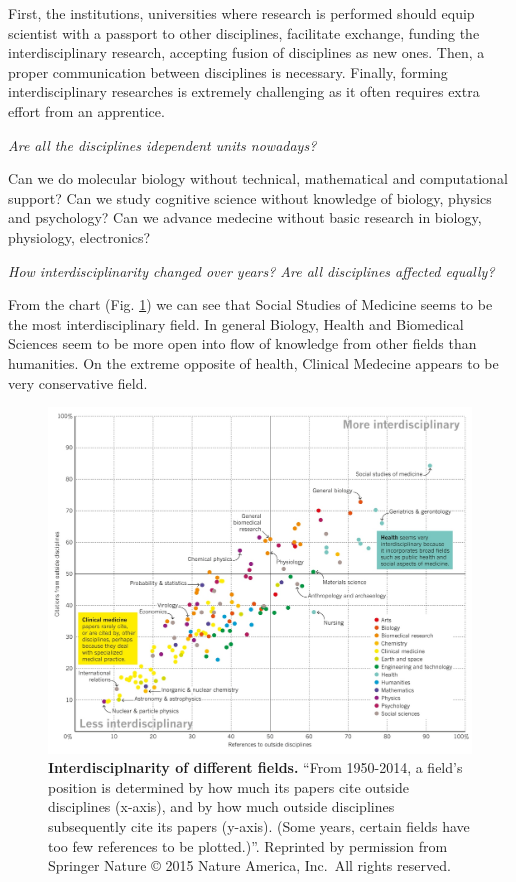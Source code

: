 \documentclass[12pt,]{book}
\theoremstyle{definition}
\theoremstyle{definition}
\theoremstyle{definition}
\theoremstyle{remark}
\begin{document}
First, the institutions, universities where research is performed should
equip scientist with a passport to other disciplines, facilitate
exchange, funding the interdisciplinary research, accepting fusion of
disciplines as new ones. Then, a proper communication between
disciplines is necessary. Finally, forming interdisciplinary researches
is extremely challenging as it often requires extra effort from an
apprentice.

\emph{Are all the disciplines idependent units nowadays?}

Can we do molecular biology without technical, mathematical and
computational support? Can we study cognitive science without knowledge
of biology, physics and psychology? Can we advance medecine without
basic research in biology, physiology, electronics?

\emph{How interdisciplinarity changed over years? Are all disciplines
affected equally?}

From the chart (Fig. \ref{fig:interdisciplinary}) we can see that Social
Studies of Medicine seems to be the most interdisciplinary field. In
general Biology, Health and Biomedical Sciences seem to be more open
into flow of knowledge from other fields than humanities. On the extreme
opposite of health, Clinical Medecine appears to be very conservative
field.

\begin{figure}

{\centering \includegraphics{figures-ext/interdisciplinary} 

}

\caption{\textbf{Interdisciplnarity of different
fields.} ``From 1950-2014, a field's position is determined by how much
its papers cite outside disciplines (x-axis), and by how much outside
disciplines subsequently cite its papers (y-axis). (Some years, certain
fields have too few references to be plotted.)''. Reprinted by
permission from Springer Nature \citep{VanNoorden2015} © 2015 Nature
America, Inc.~All rights reserved.}\label{fig:interdisciplinary}
\end{figure}
\end{document}
